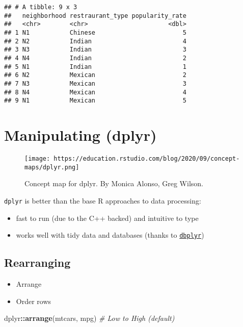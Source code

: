 \documentclass[
]{book}
\newenvironment{Shaded}{\begin{snugshade}}{\end{snugshade}}
\newcommand{\CommentTok}[1]{\textcolor[rgb]{0.56,0.35,0.01}{\textit{#1}}}
\newcommand{\KeywordTok}[1]{\textcolor[rgb]{0.13,0.29,0.53}{\textbf{#1}}}
\newcommand{\NormalTok}[1]{#1}
\newcommand{\OperatorTok}[1]{\textcolor[rgb]{0.81,0.36,0.00}{\textbf{#1}}}
\providecommand{\tightlist}{%
  \setlength{\itemsep}{0pt}\setlength{\parskip}{0pt}}
\begin{document}
\begin{verbatim}
## # A tibble: 9 x 3
##   neighborhood restraurant_type popularity_rate
##   <chr>        <chr>                      <dbl>
## 1 N1           Chinese                        5
## 2 N2           Indian                         4
## 3 N3           Indian                         3
## 4 N4           Indian                         2
## 5 N1           Indian                         1
## 6 N2           Mexican                        2
## 7 N3           Mexican                        3
## 8 N4           Mexican                        4
## 9 N1           Mexican                        5
\end{verbatim}

\hypertarget{manipulating-dplyr}{%
\section{Manipulating (dplyr)}\label{manipulating-dplyr}}

\begin{figure}
\centering
\texttt{[image: https://education.rstudio.com/blog/2020/09/concept-maps/dplyr.png]}
\caption{Concept map for dplyr. By Monica Alonso, Greg Wilson.}
\end{figure}

\texttt{dplyr} is better than the base R approaches to data processing:

\begin{itemize}
\tightlist
\item
  fast to run (due to the C++ backed) and intuitive to type
\item
  works well with tidy data and databases (thanks to \href{https://dbplyr.tidyverse.org/}{\texttt{dbplyr}})
\end{itemize}

\hypertarget{rearranging}{%
\subsection{Rearranging}\label{rearranging}}

\begin{itemize}
\item
  Arrange
\item
  Order rows
\end{itemize}

\begin{Shaded}
\begin{Highlighting}[]
\NormalTok{dplyr}\OperatorTok{::}\KeywordTok{arrange}\NormalTok{(mtcars, mpg) }\CommentTok{\# Low to High (default)}
\end{Highlighting}
\end{Shaded}
\end{document}
